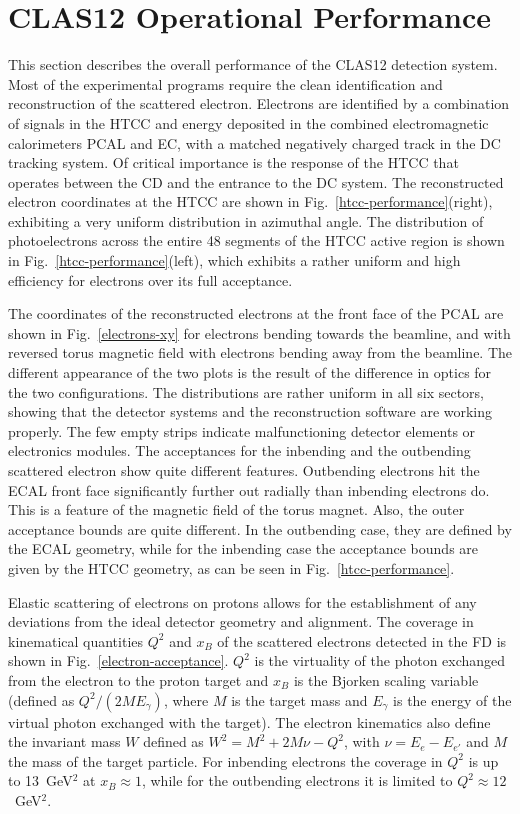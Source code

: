 \documentclass[final,3p,twocolumn]{elsarticle}
\begin{document}
\section{CLAS12 Operational Performance}

This section describes the overall performance of the CLAS12 detection system. Most of the experimental programs
require the clean identification and reconstruction of the scattered electron. Electrons are identified by a combination
of signals in the HTCC and energy deposited in the combined electromagnetic calorimeters PCAL and EC, with a matched
negatively charged track in the DC tracking system. Of critical importance is the response of the HTCC that operates
between the CD and the entrance to the DC system. The reconstructed electron coordinates at the HTCC are shown in
Fig.~\ref{htcc-performance}(right), exhibiting a very uniform distribution in azimuthal angle. The distribution of
photoelectrons across the entire 48 segments of the HTCC active region is shown in Fig.~\ref{htcc-performance}(left),
which exhibits a rather uniform and high efficiency for electrons over its full acceptance.

The coordinates of the reconstructed electrons at the front face of the PCAL are shown in Fig.~\ref{electrons-xy} for
electrons bending towards the beamline, and with reversed torus magnetic field with electrons bending away from the
beamline. The different appearance of the two plots is the result of the difference in optics for the two configurations.
The distributions are rather uniform in all six sectors, showing that the detector systems and the reconstruction
software are working properly. The few empty strips indicate malfunctioning detector elements or electronics modules.
The acceptances for the inbending and the outbending scattered electron show quite different features. Outbending
electrons hit the ECAL front face significantly further out radially than inbending electrons do. This is a feature of the
magnetic field of the torus magnet.  Also, the outer acceptance bounds are quite different. In the outbending case, they
are defined by the ECAL geometry, while for the inbending case the acceptance bounds are given by the HTCC geometry,
as can be seen in Fig.~\ref{htcc-performance}.      

Elastic scattering  of electrons on protons allows for the establishment of any deviations from the ideal detector
geometry and alignment. The coverage in kinematical quantities $Q^2$ and $x_B$ of the scattered electrons detected
in the FD is shown in Fig.~\ref{electron-acceptance}. $Q^2$ is the virtuality of the photon exchanged from the
electron to the proton target and $x_B$ is the Bjorken scaling variable (defined as $Q^2/(2 M E_\gamma)$, where $M$
is the target mass and $E_\gamma$ is the energy of the virtual photon exchanged with the target). The electron
kinematics also define the invariant mass $W$ defined as $W^2 = M^2 + 2M\nu - Q^2$, with $\nu = E_e - E_{e'}$ and
$M$ the mass of the target particle. For inbending electrons the coverage in $Q^2$ is up to 13~GeV$^2$ at
$x_B \approx 1$, while for the outbending electrons it is limited to  $Q^2 \approx 12$~GeV$^2$. 
\end{document}
